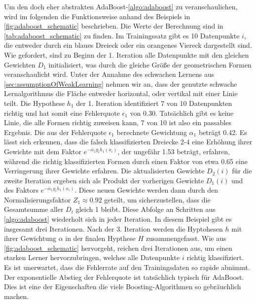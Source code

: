 Um den doch eher abstrakten AdaBoost-\autoref{algo:adaboost} zu veranschaulichen, wird im folgenden die Funktionsweise anhand des Beispiels in \autoref{fig:adaboost_schematic} beschrieben. Die Werte der Berechnung sind in \autoref{tab:adaboost_schematic} zu finden. 
\newline
Im Trainingssatz gibt es 10 Datenpunkte \( i \), die entweder durch ein blaues Dreieck oder ein orangenes Viereck dargestellt sind. Wie gefordert, sind zu Beginn der 1. Iteration alle Datenpunkte  mit den gleichen Gewichten \( D_1 \) initialisiert, was  durch die gleiche Größe der geometrischen Formen veranschaulicht wird.
\newline
Unter der Annahme des schwachen Lernens aus \autoref{sec:assumptionOfWeakLearning} nehmen wir an, dass der genutzte schwache Lernalgorithmus die Fläche entweder horizontal, oder vertikal mit einer Linie teilt. Die Hypothese \( h_1 \) der 1. Iteration identifiziert 7 von 10 Datenpunkten richtig und hat somit eine Fehlerquote \( \epsilon_1 \) von 0.30. Tatsächlich gibt es keine Linie, die alle Formen richtig zuweisen kann, 7 von 10 ist also ein passables Ergebnis.
\newline
Die aus der Fehlerquote \( \epsilon_1 \) berechnete Gewichtung \( \alpha_1 \) beträgt 0.42. Es lässt sich erkennen, dass die falsch klassifizierten Dreiecke 2-4 eine Erhöhung ihrer Gewichte mit dem Faktor \( e^{-\alpha_1 y_i h_1(x_i)} \), der ungefähr 1.53 beträgt, erfahren, während die richtig klassifizierten Formen durch einen Faktor von etwa 0.65 eine Verringerung ihrer Gewichte erfahren.
\newline
Die aktualisierten Gewichte \( D_2(i) \) für die zweite Iteration ergeben sich als Produkt der vorherigen Gewichte \( D_1(i) \) und des Faktors \( e^{-\alpha_1 y_i h_1(x_i)} \). Diese neuen Gewichte werden dann durch den Normalisierungsfaktor \( Z_1 \approx 0.92 \) geteilt, um sicherzustellen, dass die Gesamtsumme aller \( D_t \) gleich 1 bleibt.
\newline
\newline
Diese Abfolge an Schritten aus \autoref{algo:adaboost} wiederholt sich in jeder Iteration. In diesem Beispiel gibt es insgesamt drei Iterationen. Nach der 3. Iteration werden die Hyptohesen \( h \) mit ihrer Gewichtung \( \alpha \) in der finalen Hypthese \( H \) zusammengefasst.
\newline
Wie aus \autoref{fig:adaboost_schematic} hervorgeht, reichen drei Iterationen aus, um einen starken Lerner hervorzubringen, welches alle Datenpunkte \( i \) richtig klassifiziert. Es ist unerwartet, dass die Fehlerrate auf den Trainingsdaten so rapide abnimmt. Der exponentielle Abstieg der Fehlerquote ist tatsächlich typisch für AdaBoost. Dies ist eine der Eigenschaften die viele Boosting-Algorithmen so gebräuchlich machen. 


